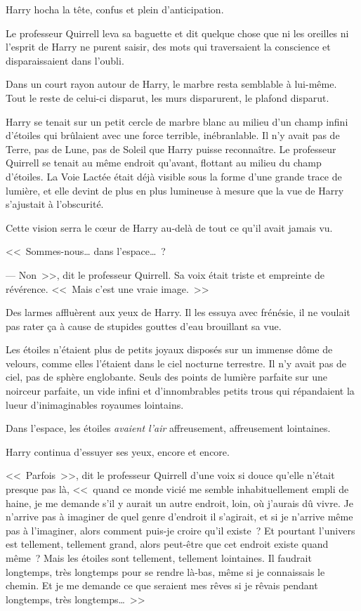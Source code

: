 Harry hocha la tête, confus et plein d'anticipation.

Le professeur Quirrell leva sa baguette et dit quelque chose que ni les oreilles ni l'esprit de Harry ne purent saisir, des mots qui traversaient la conscience et disparaissaient dans l'oubli.

Dans un court rayon autour de Harry, le marbre resta semblable à lui-même. Tout le reste de celui-ci disparut, les murs disparurent, le plafond disparut.

Harry se tenait sur un petit cercle de marbre blanc au milieu d'un champ infini d'étoiles qui brûlaient avec une force terrible, inébranlable. Il n'y avait pas de Terre, pas de Lune, pas de Soleil que Harry puisse reconnaître. Le professeur Quirrell se tenait au même endroit qu'avant, flottant au milieu du champ d'étoiles. La Voie Lactée était déjà visible sous la forme d'une grande trace de lumière, et elle devint de plus en plus lumineuse à mesure que la vue de Harry s'ajustait à l'obscurité.

Cette vision serra le cœur de Harry au-delà de tout ce qu'il avait jamais vu.

<<~Sommes-nous… dans l'espace…~?

--- Non~>>, dit le professeur Quirrell. Sa voix était triste et empreinte de révérence. <<~Mais c'est une vraie image.~>>

Des larmes affluèrent aux yeux de Harry. Il les essuya avec frénésie, il ne voulait pas rater ça à cause de stupides gouttes d'eau brouillant sa vue.

Les étoiles n'étaient plus de petits joyaux disposés sur un immense dôme de velours, comme elles l'étaient dans le ciel nocturne terrestre. Il n'y avait pas de ciel, pas de sphère englobante. Seuls des points de lumière parfaite sur une noirceur parfaite, un vide infini et d'innombrables petits trous qui répandaient la lueur d'inimaginables royaumes lointains.

Dans l'espace, les étoiles \emph{avaient l'air} affreusement, affreusement lointaines.

Harry continua d'essuyer ses yeux, encore et encore.

<<~Parfois~>>, dit le professeur Quirrell d'une voix si douce qu'elle n'était presque pas là, <<~quand ce monde vicié me semble inhabituellement empli de haine, je me demande s'il y aurait un autre endroit, loin, où j'aurais dû vivre. Je n'arrive pas à imaginer de quel genre d'endroit il s'agirait, et si je n'arrive même pas à l'imaginer, alors comment puis-je croire qu'il existe~? Et pourtant l'univers est tellement, tellement grand, alors peut-être que cet endroit existe quand même~? Mais les étoiles sont tellement, tellement lointaines. Il faudrait longtemps, très longtemps pour se rendre là-bas, même si je connaissais le chemin. Et je me demande ce que seraient mes rêves si je rêvais pendant longtemps, très longtemps…~>>

